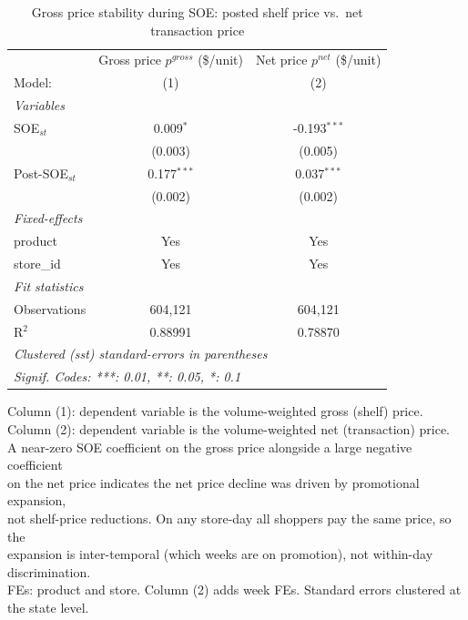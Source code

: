 
\begin{table}[htbp]
   \caption{\label{tab:gross_price_stability} Gross price stability during SOE: posted shelf price vs.\ net transaction price}
   \centering
   \begin{tabular}{lcc}
      \tabularnewline \midrule \midrule
                      & Gross price $p^{gross}$ (\$/unit)  & Net price $p^{net}$ (\$/unit) \\    
      Model:          & (1)                                & (2)\\  
      \midrule
      \emph{Variables}\\
      SOE$_{st}$      & 0.009$^{*}$                        & -0.193$^{***}$\\   
                      & (0.003)                            & (0.005)\\   
      Post-SOE$_{st}$ & 0.177$^{***}$                      & 0.037$^{***}$\\   
                      & (0.002)                            & (0.002)\\   
      \midrule
      \emph{Fixed-effects}\\
      product         & Yes                                & Yes\\  
      store\_id       & Yes                                & Yes\\  
      \midrule
      \emph{Fit statistics}\\
      Observations    & 604,121                            & 604,121\\  
      R$^2$           & 0.88991                            & 0.78870\\  
      \midrule \midrule
      \multicolumn{3}{l}{\emph{Clustered (sst) standard-errors in parentheses}}\\
      \multicolumn{3}{l}{\emph{Signif. Codes: ***: 0.01, **: 0.05, *: 0.1}}\\
   \end{tabular}
   
   \par \raggedright 
   Column (1): dependent variable is the volume-weighted gross (shelf) price.\\
   Column (2): dependent variable is the volume-weighted net (transaction) price.\\
   A near-zero SOE coefficient on the gross price alongside a large negative coefficient\\
   on the net price indicates the net price decline was driven by promotional expansion,\\
   not shelf-price reductions. On any store-day all shoppers pay the same price, so the\\
   expansion is inter-temporal (which weeks are on promotion), not within-day discrimination.\\
   FEs: product and store. Column (2) adds week FEs. Standard errors clustered at the state level.
\end{table}



